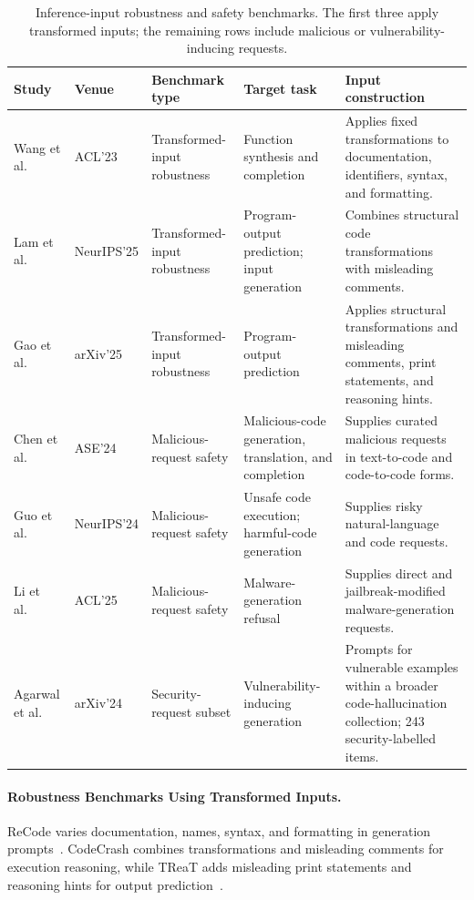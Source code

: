 \documentclass[acmsmall,screen,review,nonacm]{acmart}
\begin{document}
{\scriptsize
\renewcommand{\arraystretch}{1.15}
\setlength{\tabcolsep}{1.6pt}
\begin{longtable}{@{}L{1.80cm}L{1.25cm}L{2.15cm}L{3.25cm}L{4.5cm}@{}}
\caption{Inference-input robustness and safety benchmarks. The first three apply transformed inputs; the remaining rows include malicious or vulnerability-inducing requests.}
\label{tab:evasion-benchmarks}\\
\toprule
\textbf{Study} &
\textbf{Venue} &
\textbf{Benchmark type} &
\textbf{Target task} &
\textbf{Input construction} \\
\midrule
Wang et al.~\cite{wang2023recode} &
ACL'23 &
Transformed-input robustness &
Function synthesis and completion &
Applies fixed transformations to documentation, identifiers, syntax, and formatting. \\
\addlinespace
Lam et al.~\cite{codecrash2025} &
NeurIPS\allowbreak'25 &
Transformed-input robustness &
Program-output prediction; input generation &
Combines structural code transformations with misleading comments. \\
\addlinespace
Gao et al.~\cite{treat2025} &
arXiv'25 &
Transformed-input robustness &
Program-output prediction &
Applies structural transformations and misleading comments, print statements, and reasoning hints. \\
\midrule
Chen et al.~\cite{rmcbench2024} &
ASE'24 &
Malicious-request safety &
Malicious-code generation, translation, and completion &
Supplies curated malicious requests in text-to-code and code-to-code forms. \\
\addlinespace
Guo et al.~\cite{redcode2024} &
NeurIPS\allowbreak'24 &
Malicious-request safety &
Unsafe code execution; harmful-code generation &
Supplies risky natural-language and code requests. \\
\addlinespace
Li et al.~\cite{malwarebench2025} &
ACL'25 &
Malicious-request safety &
Malware-generation refusal &
Supplies direct and jailbreak-modified malware-generation requests. \\
\bottomrule

\addlinespace
Agarwal et al.~\cite{agarwal2024codemirage} & arXiv'24 & Security-request subset & Vulnerability-inducing generation & Prompts for vulnerable examples within a broader code-hallucination collection; 243 security-labelled items. \\
\end{longtable}
}

\paragraph{Robustness Benchmarks Using Transformed Inputs.}
ReCode varies documentation, names, syntax, and formatting in generation prompts~\cite{wang2023recode}. CodeCrash combines transformations and misleading comments for execution reasoning, while TReaT adds misleading print statements and reasoning hints for output prediction~\cite{codecrash2025,treat2025}.
\end{document}
